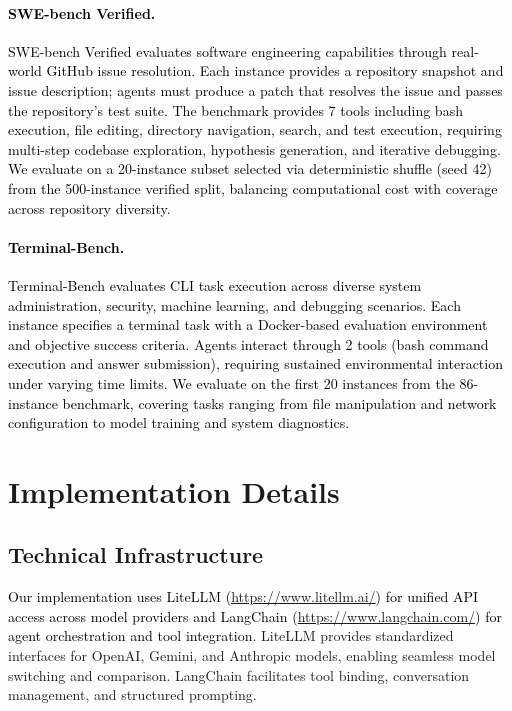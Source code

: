 \textcolor{black}{\paragraph{SWE-bench Verified.}
SWE-bench Verified \citep{jimenez2023swe} evaluates software engineering capabilities through real-world GitHub issue resolution. Each instance provides a repository snapshot and issue description; agents must produce a patch that resolves the issue and passes the repository's test suite. The benchmark provides 7 tools including bash execution, file editing, directory navigation, search, and test execution, requiring multi-step codebase exploration, hypothesis generation, and iterative debugging. We evaluate on a 20-instance subset selected via deterministic shuffle (seed 42) from the 500-instance verified split, balancing computational cost with coverage across repository diversity.}

\textcolor{black}{\paragraph{Terminal-Bench.}
Terminal-Bench \citep{merrill2026terminal} evaluates CLI task execution across diverse system administration, security, machine learning, and debugging scenarios. Each instance specifies a terminal task with a Docker-based evaluation environment and objective success criteria. Agents interact through 2 tools (bash command execution and answer submission), requiring sustained environmental interaction under varying time limits. We evaluate on the first 20 instances from the 86-instance benchmark, covering tasks ranging from file manipulation and network configuration to model training and system diagnostics.}

\section{Implementation Details}

\subsection{Technical Infrastructure}

\textcolor{black}{Our implementation uses LiteLLM (\url{https://www.litellm.ai/}) for unified API access across model providers and LangChain (\url{https://www.langchain.com/}) for agent orchestration and tool integration.} LiteLLM provides standardized interfaces for OpenAI, Gemini, and Anthropic models, enabling seamless model switching and comparison. LangChain facilitates tool binding, conversation management, and structured prompting.

